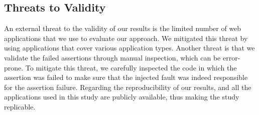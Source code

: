 \subsection{Threats to Validity} \label{threatsToValidity}

An external threat to the validity of our results is the limited number of web applications that we use to evaluate our approach. 
We mitigated this threat by using \javascript applications that cover various application types.
Another threat is that we validate the failed assertions through manual inspection,  which can be error-prone. To mitigate this threat, we carefully inspected the code in which the assertion was failed to make sure that the injected fault was indeed responsible for the assertion failure. %
Regarding the reproducibility of our results, \tool and all the applications used in this study are publicly available, thus making the study replicable.
